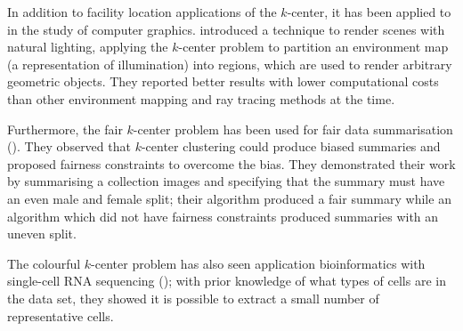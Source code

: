 In addition to facility location applications of the $k$-center, it has been applied to in the study of computer graphics. \textcite{agarwal_structured_2003} introduced a technique to render scenes with natural lighting, applying the $k$-center problem to partition an environment map (a representation of illumination) into regions, which are used to render arbitrary geometric objects. They reported better results with lower computational costs than other environment mapping and ray tracing methods at the time.

Furthermore, the fair $k$-center problem has been used for fair data summarisation (\cite{kleindessner_fair_2019}). They observed that $k$-center clustering could produce biased summaries and proposed fairness constraints to overcome the bias. They demonstrated their work by summarising a collection images and specifying that the summary must have an even male and female split; their algorithm produced a fair summary while an algorithm which did not have fairness constraints produced summaries with an uneven split. 

The colourful $k$-center problem has also seen application bioinformatics with single-cell RNA sequencing (\cite{do_sphetcher_2020}); with prior knowledge of what types of cells are in the data set, they showed it is possible to extract a small number of representative cells.